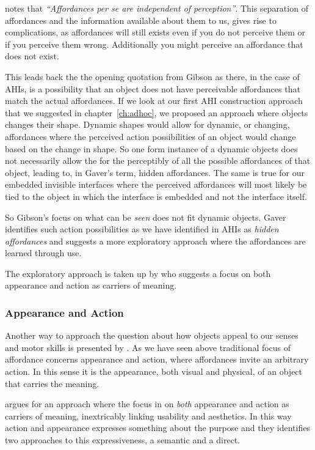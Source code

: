 \citet{gaver1991technology} notes that \emph{``Affordances per se are independent of perception''}.
This separation of affordances and the information available about them to us, gives rise to complications, as affordances will still exists even if you do not perceive them or if you perceive them wrong.
Additionally you might perceive an affordance that does not exist.

This leads back the the opening quotation from Gibson as there, in the case of AHIs, is a possibility that an object does not have perceivable affordances that match the actual affordances.
If we look at our first AHI construction approach that we suggested in chapter~\ref{ch:adhoc}, we proposed an approach where objects changes their shape.
Dynamic shapes would allow for dynamic, or changing, affordances where the perceived action possibilities of an object would change based on the change in shape.
So one form instance of a dynamic objects does not necessarily allow the for the perceptibly of all the possible affordances of that object, leading to, in Gaver's term, hidden affordances. 
The same is true for our embedded invisible interfaces where the perceived affordances will most likely be tied to the object in which the interface is embedded and not the interface itself.

So Gibson's focus on what can be \emph{seen} does not fit dynamic objects.
Gaver identifies such action possibilities as we have identified in AHIs as \emph{hidden affordances} and suggests a more exploratory approach where the affordances are learned through use.

The exploratory approach is taken up by \citet{djajadiningrat2004tangible} who suggests a focus on both appearance and action as carriers of meaning.

\subsubsection{Appearance and Action}
Another way to approach the question about how objects appeal to our senses and motor skills is presented by \citet{djajadiningrat2004tangible}.
As we have seen above traditional focus of affordance concerns appearance and action, where affordances invite an arbitrary action. 
In this sense it is the appearance, both visual and physical, of an object that carries the meaning.

\citeauthor{djajadiningrat2004tangible} argues for an approach where the focus in on \emph{both} appearance and action as carriers of meaning, inextricably linking usability and aesthetics.
In this way action and appearance expresses something about the purpose and they identifies two approaches to this expressiveness, a semantic and a direct.

